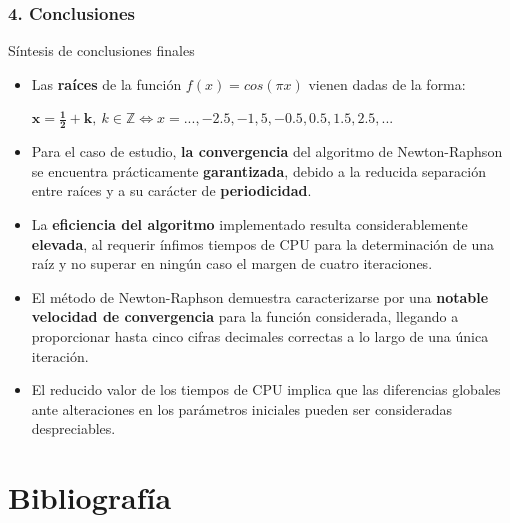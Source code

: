 \documentclass{beamer}
\begin{document}
\begin{frame}
\frametitle{4. Conclusiones}
\begin{block}{Síntesis de conclusiones finales}

\begin{itemize}
    \item
      Las \textbf{raíces} de la función $f(x) = cos (\pi x)$ vienen dadas de la forma:
      \begin{center}
      $\boldsymbol{x = \frac{1}{2} + k}, \ k \in \mathbb{Z} \iff x = ..., -2.5, -1,5, -0.5, 0.5, 
      1.5, 2.5, ...$
      \end{center}
      \pause  
      \vspace*{-0.1cm}
    \item
      Para el caso de estudio, \textbf{la convergencia} del algoritmo de Newton-Raphson se encuentra 
      prácticamente \textbf{garantizada}, debido a la reducida separación entre raíces y a su carácter 
      de \textbf{periodicidad}.
      \pause  
      \vspace*{-0.1cm}
    \item
      La \textbf{eficiencia del algoritmo} implementado resulta considerablemente \textbf{elevada}, al 
      requerir ínfimos tiempos de CPU para la determinación de una raíz y no superar en ningún caso el 
      margen de cuatro iteraciones.
      \pause  
      \vspace*{-0.1cm}
    \item
      El método de Newton-Raphson demuestra caracterizarse por una \textbf{notable velocidad de 
      convergencia} para la función considerada, llegando a proporcionar hasta cinco cifras decimales 
      correctas a lo largo de una única iteración.
      \pause  
      \vspace*{-0.1cm}
    \item
      El reducido valor de los tiempos de CPU implica que las diferencias globales ante alteraciones
      en los parámetros iniciales pueden ser consideradas despreciables.
      
\end{itemize} 

\end{block}
\end{frame}


\section{Bibliografía}
\end{document}
